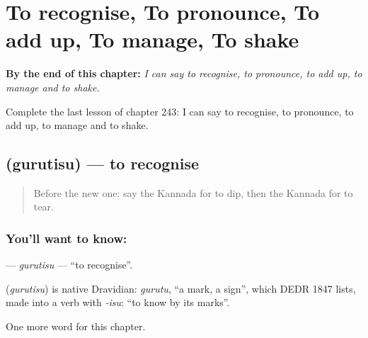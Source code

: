 
\chapter{To recognise, To pronounce, To add up, To manage, To shake}
\label{ch:ka-to-recognise-to-pronounce-to-add-up-to-manage-to-shake}

\begin{chapteropening}
\textbf{By the end of this chapter:} \emph{I can say to recognise, to pronounce, to add up, to manage and to shake.}

Complete the last lesson of chapter 243: I can say to recognise, to pronounce, to add up, to manage and to shake.
\end{chapteropening}

\section[\texorpdfstring{\kn{ಗುರುತಿಸು} (gurutisu)}{ಗುರುತಿಸು (gurutisu)}]{ (gurutisu) — to recognise}

\label{lesson:KA-C243-gurutisu}



\begin{quote}
Before the new one: say the Kannada for to dip, then the Kannada for to tear.
\end{quote}

\subsection*{You'll want to know: }
\textbf{} — \emph{gurutisu} — \textquotedblleft{}to recognise\textquotedblright{}.

\begin{cousinweb}
\textbf{} (\emph{gurutisu}) is native Dravidian: \emph{gurutu}, \textquotedblleft{}a mark, a sign\textquotedblright{}, which DEDR 1847 lists, made into a verb with \emph{-isu}: \textquotedblleft{}to know by its marks\textquotedblright{}.
\end{cousinweb}

\begin{grammarlens}[title={What you've built}]
One more word for this chapter.
\end{grammarlens}

